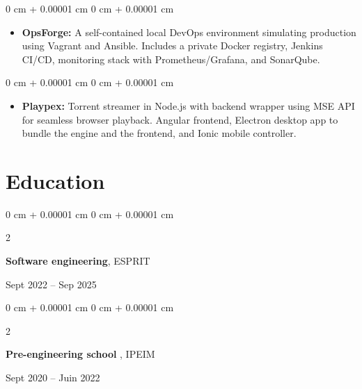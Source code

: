 \documentclass[10pt, letterpaper]{article}
\newenvironment{highlights}{
  \begin{itemize}[
    topsep=0.10 cm,
    parsep=0.10 cm,
    partopsep=0pt,
    itemsep=0pt,
    leftmargin=0 cm + 10pt
    ]
  }{
\end{itemize}
}
\newenvironment{onecolentry}{
  \begin{adjustwidth}{
      0 cm + 0.00001 cm
    }{
      0 cm + 0.00001 cm
    }
  }{
  \end{adjustwidth}
} %
\newenvironment{twocolentry}[2][]{
  \onecolentry
  \def\secondColumn{#2}
  \setcolumnwidth{\fill, 4.5 cm}
  \begin{paracol}{2}
  }{
    \switchcolumn \raggedleft \secondColumn
  \end{paracol}
  \end{onecolentry}
} %
\begin{document}
\vspace{0.1 cm}
\begin{onecolentry}
  \begin{highlights}
  \item \textbf{OpsForge:} A self-contained local DevOps environment simulating production using Vagrant and Ansible. Includes a private Docker registry, Jenkins CI/CD, monitoring stack with Prometheus/Grafana, and SonarQube.
  \end{highlights}
\end{onecolentry}
\vspace{0.1 cm}
\begin{onecolentry}
  \begin{highlights}
  \item \textbf{Playpex:} Torrent streamer in Node.js with backend wrapper using MSE API for seamless browser playback. Angular frontend, Electron desktop app to bundle the engine and the frontend, and Ionic mobile controller.
  \end{highlights}
\end{onecolentry}


  \section{Education}





  \begin{twocolentry}{
      Sept 2022 – Sep 2025
    }
    \textbf{Software engineering}, ESPRIT
  \end{twocolentry}

  \vspace{0.10 cm}

  \begin{twocolentry}{
      Sept 2020 – Juin 2022
    }
    \textbf{Pre-engineering school }, IPEIM
  \end{twocolentry}




  
\end{document}
